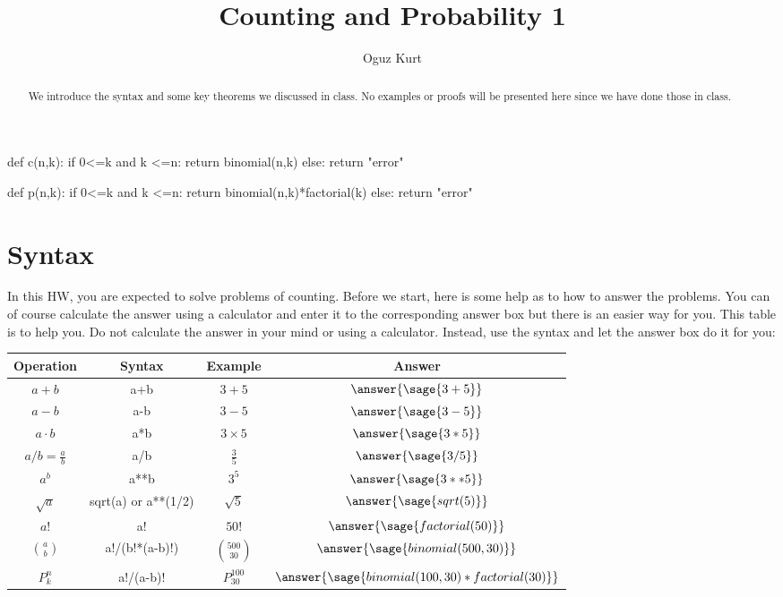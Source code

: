 \documentclass{ximera}
\title{Counting and Probability 1}
\author{Oguz Kurt}
\begin{document}
\begin{abstract}
We introduce the syntax and some key theorems we discussed in class. No examples or proofs will be presented here since we have done those in class.
\end{abstract}
\maketitle


\begin{sagesilent}
def c(n,k):
    if 0<=k and k <=n:
        return binomial(n,k)
    else:
        return "error"

def p(n,k):
    if 0<=k and k <=n:
        return binomial(n,k)*factorial(k)
    else:
        return "error"

\end{sagesilent}

\section*{Syntax}
In this HW, you are expected to solve problems of counting. Before we start, here is some help as to how to answer the problems. You can of course calculate the answer using a calculator and enter it to the corresponding answer box but there is an easier way for you. This table is to help you. Do not calculate the answer in your mind or using a calculator. Instead, use the syntax and let the answer box do it for you:

\hspace{0.5cm}

\begin{tabular}{c|c|c|c}
Operation & Syntax & Example & Answer \\
\hline
$a+b$ & {\color{red} a+b} & $3+5$ & $\answer{\sage{3+5} }$\\
\hline
$a- b$ & {\color{red} a-b} & $3-5$ & $\answer{\sage{3-5} }$\\
\hline
$a\cdot b$ & {\color{red} a*b} & $3\times 5$ & $\answer{\sage{3*5} }$\\
\hline
$a/b=\frac{a}{b}$ & {\color{red} a/b} & $\frac{3}{5}$ & $\answer{\sage{3/5} }$\\
\hline
$a^b$ & {\color{red} a**b} & $3^5$ & $\answer{\sage{3**5} }$\\
\hline
$\sqrt{a}$ & {\color{red} sqrt(a) or a**(1/2)} & $\sqrt{5}$ & $\answer{\sage{sqrt(5)} }$\\
\hline
$a!$ & {\color{red} a!} & $50!$ & $\answer{\sage{factorial(50)} }$\\
\hline
$\binom{a}{b}$ & {\color{red} a!/(b!*(a-b)!)} & $\binom{500}{30}$ & $\answer{\sage{binomial(500,30)} }$\\
\hline
$P_k^n$ & {\color{red} a!/(a-b)!} & $P_{30}^{100}$ & $\answer{\sage{binomial(100,30)*factorial(30)} }$\\
\end{tabular}
\end{document}
